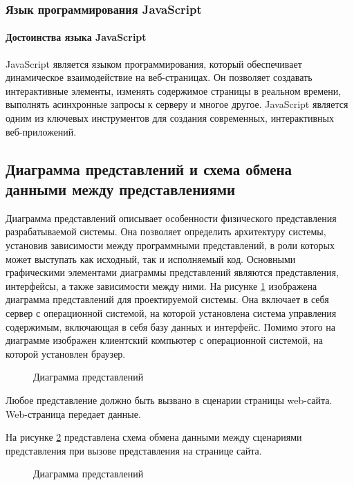 \subsubsection{Язык программирования JavaScript}

\paragraph{Достоинства языка JavaScript}

JavaScript является языком программирования, который обеспечивает динамическое взаимодействие на веб-страницах. Он позволяет создавать интерактивные элементы, изменять содержимое страницы в реальном времени, выполнять асинхронные запросы к серверу и многое другое. JavaScript является одним из ключевых инструментов для создания современных, интерактивных веб-приложений.

\subsection{Диаграмма представлений и схема обмена данными между представлениями}

Диаграмма представлений описывает особенности физического представления разрабатываемой системы. Она позволяет определить архитектуру системы, установив зависимости между программными представлений, в роли которых может выступать как исходный, так и исполняемый код. Основными графическими элементами диаграммы представлений являются представления, интерфейсы, а также зависимости между ними. На рисунке \ref{comp:image} изображена диаграмма представлений для проектируемой системы. Она включает в себя сервер с операционной системой, на которой установлена система управления содержимым, включающая в себя базу данных и интерфейс. Помимо этого на диаграмме изображен клиентский компьютер с операционной системой, на которой установлен браузер.

\begin{figure}[ht]
	\caption{Диаграмма представлений}
	\label{comp:image}
\end{figure}

Любое представление должно быть вызвано в сценарии страницы web-сайта. Web-страница передает данные.

На рисунке \ref{data:image} представлена схема обмена данными между сценариями представления при вызове представления на странице сайта.


\begin{figure}[ht]
	\caption{Диаграмма представлений}
	\label{data:image}
\end{figure}

